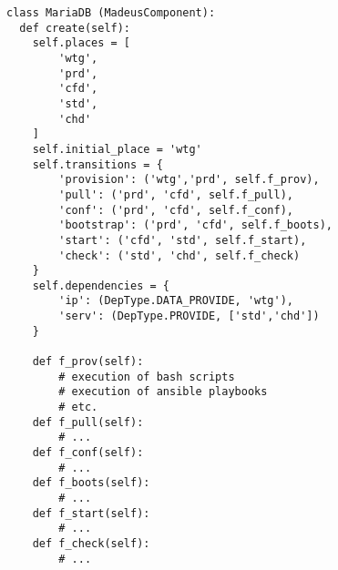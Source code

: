 \begin{lstlisting}[label=codemdb,caption=Madeus code of the MariaDB
  component type.]
class MariaDB (MadeusComponent):
  def create(self):
    self.places = [
        'wtg',
        'prd',
        'cfd',
        'std',
        'chd'
    ]
    self.initial_place = 'wtg'
    self.transitions = {
        'provision': ('wtg','prd', self.f_prov),
        'pull': ('prd', 'cfd', self.f_pull),
        'conf': ('prd', 'cfd', self.f_conf),
        'bootstrap': ('prd', 'cfd', self.f_boots),
        'start': ('cfd', 'std', self.f_start),
        'check': ('std', 'chd', self.f_check)
    }
    self.dependencies = {
        'ip': (DepType.DATA_PROVIDE, 'wtg'),
        'serv': (DepType.PROVIDE, ['std','chd'])
    }
    
    def f_prov(self):
        # execution of bash scripts
        # execution of ansible playbooks
        # etc.
    def f_pull(self):
        # ...
    def f_conf(self):
        # ...
    def f_boots(self):
        # ...
    def f_start(self):
        # ...
    def f_check(self):
        # ...
\end{lstlisting}
